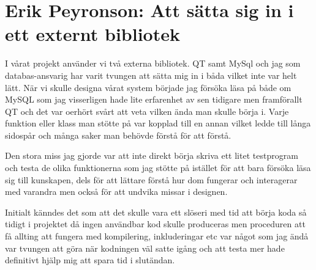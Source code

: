 \section {Erik Peyronson: Att sätta sig in i ett externt bibliotek}

I vårat projekt använder vi två externa bibliotek. QT samt MySql och
jag som databas-ansvarig har varit tvungen att sätta mig in i
båda vilket inte var helt lätt. När vi skulle designa vårat system
började jag försöka läsa på både om MySQL som jag visserligen hade
lite erfarenhet av sen tidigare men framförallt QT och det var oerhört
svårt att veta vilken ända man skulle börja i. Varje funktion eller
klass man stötte på var kopplad till en annan vilket ledde till långa
sidospår och många saker man behövde förstå för att förstå. 

Den stora miss jag gjorde var att inte direkt börja skriva ett litet
testprogram och testa de olika funktionerna som jag stötte på istället
för att bara försöka läsa sig till kunskapen, dels för att lättare
förstå hur dom fungerar och interagerar med varandra  men också för
att undvika missar i designen. 

Initialt känndes det som att det skulle vara ett slöseri med tid att
börja koda så tidigt i projektet då ingen användbar kod skulle
produceras men proceduren att få allting att fungera med kompilering,
inkluderingar etc var något som jag ändå var tvungen att göra när
kodningen väl satte igång och att testa mer hade definitivt hjälp mig
att spara tid i slutändan.
